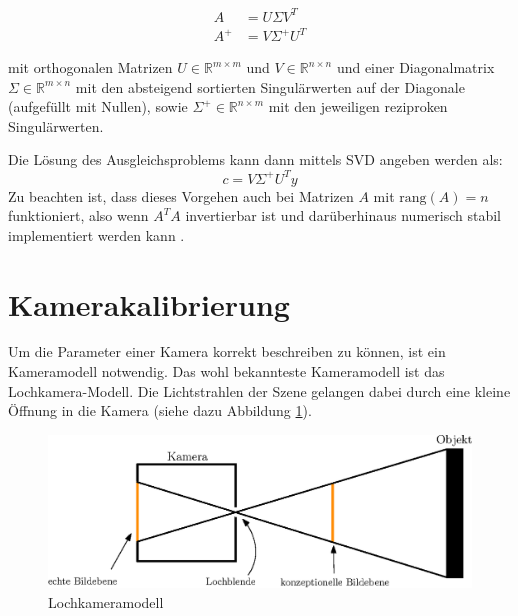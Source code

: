 \[
\begin{aligned}
A &= U\Sigma V^T \\
A^+ &= V\Sigma^+U^T
\end{aligned}
\]

mit orthogonalen Matrizen $U\in\mathbb{R}^{m\times m}$ und $V\in\mathbb{R}^{n\times n}$ und einer Diagonalmatrix $\Sigma\in\mathbb{R}^{m\times n}$ mit den absteigend sortierten Singulärwerten auf der Diagonale (aufgefüllt mit Nullen), sowie $\Sigma^+\in\mathbb{R}^{n\times m}$ mit den jeweiligen reziproken Singulärwerten.


Die Lösung des Ausgleichsproblems kann dann mittels SVD angeben werden als:
\[
c = V\Sigma^+U^Ty
\]
Zu beachten ist, dass dieses Vorgehen auch bei Matrizen $A$ mit $\text{rang}\left(A\right) = n$ funktioniert, also wenn $A^TA$ invertierbar ist und darüberhinaus numerisch stabil implementiert werden kann \cite{Stoer2011}.



\section{Kamerakalibrierung}
\label{s:calib}

Um die Parameter einer Kamera korrekt beschreiben zu können, ist ein Kameramodell notwendig. Das wohl bekannteste Kameramodell ist das Lochkamera-Modell. Die Lichtstrahlen der Szene gelangen dabei durch eine kleine Öffnung in die Kamera (siehe dazu Abbildung \ref{fig:pinhole}).
\begin{figure}[!htb]
	\centering
	\includegraphics[scale=.8]{images/pinhole2.eps}
	\caption{Lochkameramodell}
	\label{fig:pinhole}
\end{figure}

